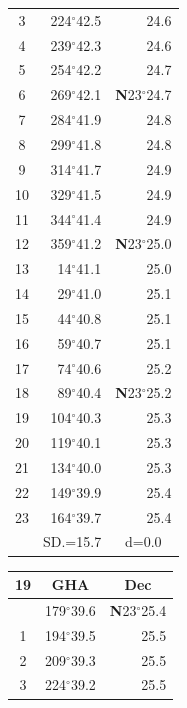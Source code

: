 \documentclass[10pt, a4paper]{report}
\begin{document}
\begin{scriptsize}
\begin{tabular*}{0.2\textwidth}[t]{@{\extracolsep{\fill}}|c|rr|}
3 & 224$^\circ$42.5 & \raisebox{0.24ex}{\boldmath$\cdot$~\boldmath$\cdot$~~}24.6\\
4 & 239$^\circ$42.3 & 24.6\\
5 & 254$^\circ$42.2 & 24.7\\[2Pt]
6 & 269$^\circ$42.1 & \textbf{N}23$^\circ$24.7\\
7 & 284$^\circ$41.9 & 24.8\\
8 & 299$^\circ$41.8 & 24.8\\
9 & 314$^\circ$41.7 & \raisebox{0.24ex}{\boldmath$\cdot$~\boldmath$\cdot$~~}24.9\\
10 & 329$^\circ$41.5 & 24.9\\
11 & 344$^\circ$41.4 & 24.9\\[2Pt]
12 & 359$^\circ$41.2 & \textbf{N}23$^\circ$25.0\\
13 & 14$^\circ$41.1 & 25.0\\
14 & 29$^\circ$41.0 & 25.1\\
15 & 44$^\circ$40.8 & \raisebox{0.24ex}{\boldmath$\cdot$~\boldmath$\cdot$~~}25.1\\
16 & 59$^\circ$40.7 & 25.1\\
17 & 74$^\circ$40.6 & 25.2\\[2Pt]
18 & 89$^\circ$40.4 & \textbf{N}23$^\circ$25.2\\
19 & 104$^\circ$40.3 & 25.3\\
20 & 119$^\circ$40.1 & 25.3\\
21 & 134$^\circ$40.0 & \raisebox{0.24ex}{\boldmath$\cdot$~\boldmath$\cdot$~~}25.3\\
22 & 149$^\circ$39.9 & 25.4\\
23 & 164$^\circ$39.7 & 25.4\\
\hline
\rule{0pt}{2.4ex} & \multicolumn{1}{c}{SD.=15.7} & \multicolumn{1}{c|}{d=0.0}\\
\hline
\end{tabular*}\noindent
\begin{tabular*}{0.2\textwidth}[t]{@{\extracolsep{\fill}}|c|rr|}
\hline
\multicolumn{1}{|c|}{\rule{0pt}{2.6ex}\textbf{19}} & \multicolumn{1}{c}{\textbf{GHA}} & \multicolumn{1}{c|}{\textbf{Dec}}\\
\hline\rule{0pt}{2.6ex}\noindent
0 & 179$^\circ$39.6 & \textbf{N}23$^\circ$25.4\\
1 & 194$^\circ$39.5 & 25.5\\
2 & 209$^\circ$39.3 & 25.5\\
3 & 224$^\circ$39.2 & \raisebox{0.24ex}{\boldmath$\cdot$~\boldmath$\cdot$~~}25.5\\

\end{tabular*}
\end{scriptsize}
\end{document}

